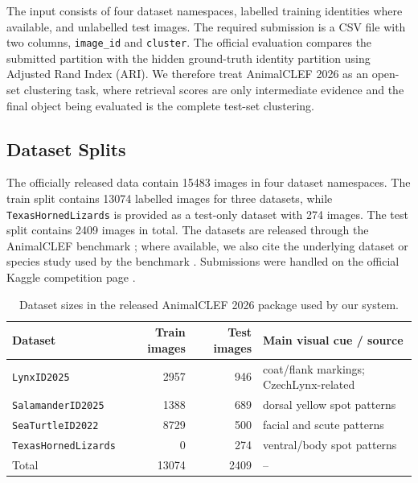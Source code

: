 \documentclass{ceurart}
\newcommand{\dataset}[1]{\texttt{#1}}
\newcommand{\method}[1]{\texttt{#1}}
\newcommand{\datasetname}[1]{\mbox{\texttt{\small #1}}}
\begin{document}
The input consists of four dataset namespaces, labelled training identities where available, and unlabelled test images. The required submission is a CSV file with two columns, \method{image\_id} and \method{cluster}. The official evaluation compares the submitted partition with the hidden ground-truth identity partition using Adjusted Rand Index (ARI). We therefore treat AnimalCLEF 2026 as an open-set clustering task, where retrieval scores are only intermediate evidence and the final object being evaluated is the complete test-set clustering.

\subsection{Dataset Splits}

The officially released data contain \num{15483} images in four dataset namespaces. The train split contains \num{13074} labelled images for three datasets, while \datasetname{TexasHornedLizards} is provided as a test-only dataset with \num{274} images. The test split contains \num{2409} images in total. The datasets are released through the AnimalCLEF benchmark \cite{animalclef2026overview}; where available, we also cite the underlying dataset or species study used by the benchmark \cite{animalclef2025overview,seaturtleid2022,czechlynx,biffi2025identification}. Submissions were handled on the official Kaggle competition page \cite{animalclef2026}.

\begin{table}[t]
  \centering
  \caption{Dataset sizes in the released AnimalCLEF 2026 package used by our system.}
  \label{tab:data}
  \begin{tabular}{lrrl}
    \toprule
    Dataset & Train images & Test images & Main visual cue / source \\
    \midrule
    \dataset{LynxID2025} & 2957 & 946 & coat/flank markings; CzechLynx-related \cite{czechlynx} \\
    \dataset{SalamanderID2025} & 1388 & 689 & dorsal yellow spot patterns \cite{animalclef2025overview} \\
    \dataset{SeaTurtleID2022} & 8729 & 500 & facial and scute patterns \cite{seaturtleid2022} \\
    \dataset{TexasHornedLizards} & 0 & 274 & ventral/body spot patterns \cite{biffi2025identification} \\
    \midrule
    Total & 13074 & 2409 & -- \\
    \bottomrule
  \end{tabular}
\end{table}
\end{document}
